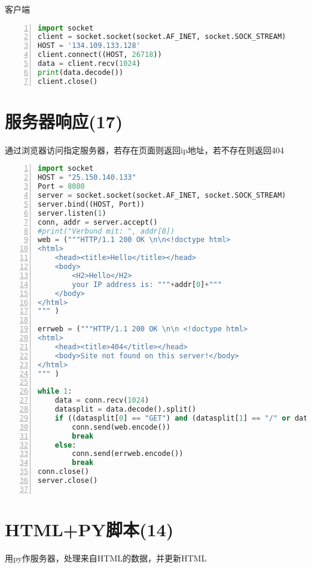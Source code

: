 \documentclass[fleqn]{article}
\begin{document}
\noindent 客户端
\begin{lstlisting}[language = Python, numbers=left, 
    numberstyle=\tiny,keywordstyle=\color{blue!70},
    commentstyle=\color{red!50!green!50!blue!50},frame=shadowbox,
    rulesepcolor=\color{red!20!green!20!blue!20},basicstyle=\ttfamily]
import socket
client = socket.socket(socket.AF_INET, socket.SOCK_STREAM)
HOST = '134.109.133.128'
client.connect((HOST, 26718))
data = client.recv(1024)
print(data.decode())
client.close()
\end{lstlisting}

\clearpage
\section{服务器响应(17)}
\noindent 通过浏览器访问指定服务器，若存在页面则返回ip地址，若不存在则返回404

\begin{lstlisting}[language = Python, numbers=left, 
    numberstyle=\tiny,keywordstyle=\color{blue!70},
    commentstyle=\color{red!50!green!50!blue!50},frame=shadowbox,
    rulesepcolor=\color{red!20!green!20!blue!20},basicstyle=\ttfamily]
import socket
HOST = "25.150.140.133"
Port = 8080
server = socket.socket(socket.AF_INET, socket.SOCK_STREAM)
server.bind((HOST, Port))
server.listen(1)
conn, addr = server.accept()
#print("Verbund mit: ", addr[0])
web = ("""HTTP/1.1 200 OK \n\n<!doctype html>
<html>
    <head><title>Hello</title></head>
    <body>
        <H2>Hello</H2>
        your IP address is: """+addr[0]+"""
    </body>
</html>
""" )

errweb = ("""HTTP/1.1 200 OK \n\n <!doctype html>
<html>
    <head><title>404</title></head>
    <body>Site not found on this server!</body>
</html>
""" )

while 1:
    data = conn.recv(1024)
    datasplit = data.decode().split()
    if ((datasplit[0] == "GET") and (datasplit[1] == "/" or datasplit[1] == "/index.html") and (datasplit[2] == "HTTP/1.1")):
        conn.send(web.encode())
        break
    else:
        conn.send(errweb.encode())
        break
conn.close()
server.close()
    
\end{lstlisting}

\section{HTML+PY脚本(14)}
\noindent 用py作服务器，处理来自HTML的数据，并更新HTML
\end{document}
